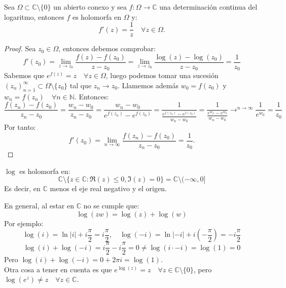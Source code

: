 \begin{proposición}
    Sea $\Omega \subset \mathbb{C} \setminus \{0\}$ un abierto conexo y sea $f : \Omega \to \mathbb{C}$ una determinación continua del logaritmo, entonces $f$ es holomorfa en $\Omega$ y:
    \[
        f'(z) = \frac{1}{z} \quad \forall z \in \Omega.
    \]
\end{proposición}

\begin{proof}
    Sea $z_0 \in \Omega$, entonces debemos comprobar:
    \[
        f'(z_0) = \lim_{z \to z_0} \frac{f(z) - f(z_0)}{z - z_0} = 
        \lim_{z \to z_0} \frac{\log(z) - \log(z_0)}{z - z_0} = 
        \frac{1}{z_0}
    \]
    Sabemos que $e^{f(z)} = z \quad \forall z \in \Omega$, luego podemos tomar una sucesión $(z_n)_{n=1}^\infty\subset \Omega \setminus \{z_0\}$ tal que $z_n \to z_0$. Llamemos además $w_0 = f(z_0)$ y $w_n = f(z_n) \quad \forall n \in \mathbb{N}$. Entonces:
    \[
    \frac{f(z_n) - f(z_0)}{z_n - z_0} =
    \frac{w_n - w_0}{z_n - z_0} =
    \frac{w_n - w_0}{e^{f(z_n)} - e^{f(z_0)}} =
    \frac{1}{\frac{e^{f(z_n)} - e^{f(z_0)}}{w_n - w_0}} =
    \frac{1}{\frac{e^{w_n} - e^{w_0}}{w_n - w_0}}
    \longrightarrow^{n \to \infty} \frac{1}{e^{w_0}} = \frac{1}{z_0}
    \]
    Por tanto:
    \[
        f'(z_0) = \lim_{n \to \infty} \frac{f(z_n) - f(z_0)}{z_n - z_0} = \frac{1}{z_0}.
    \]
\end{proof}

\begin{observación}
    $\log$ es holomorfa en:
    \[
    \mathbb{C} \setminus \{z \in \mathbb{C} : \Re(z) \leq 0, \Im(z) = 0\} =
    \mathbb{C} \setminus (-\infty, 0]
    \]
    Es decir, en $\mathbb{C}$ menos el eje real negativo y el origen.\\
\end{observación}

\begin{observación}
    En general, al estar en $\mathbb{C}$ no se cumple que:
    \[
        \log(zw) = \log(z) + \log(w)
    \]
    Por ejemplo:
    \[
    \log(i) = \ln|i| + i\frac{\pi}{2} = i\frac{\pi}{2}, \quad
    \log(-i) = \ln|-i| + i\left(-\frac{\pi}{2}\right) = -i\frac{\pi}{2}
    \]
    \[
        \log(i) + \log(-i) = i\frac{\pi}{2} - i\frac{\pi}{2} = 0 \neq \log(i \cdot -i) = \log(1) = 0
    \]
    Pero $\log(i) + \log(-i) = 0 + 2\pi i = \log(1)$.\\
    Otra cosa a tener en cuenta es que $e^{\log(z)} = z \quad \forall z \in \mathbb{C} \setminus \{0\}$, pero $\log(e^z) \neq z \quad \forall z \in \mathbb{C}$.
\end{observación}

